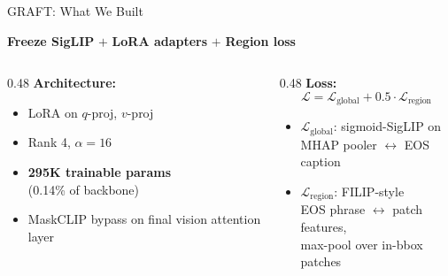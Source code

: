 \documentclass[aspectratio=169,12pt]{beamer}
\begin{document}
\begin{frame}{GRAFT: What We Built}
  \begin{center}
    \textbf{Freeze SigLIP} $+$ \textbf{LoRA adapters} $+$ \textbf{Region loss}
  \end{center}
  \vspace{0.3em}

  \begin{columns}[T]
    \begin{column}{0.48\textwidth}
      \textbf{Architecture:}
      \begin{itemize}
        \item LoRA on $q$-proj, $v$-proj
        \item Rank 4, $\alpha=16$
        \item \textbf{295K trainable params}\\(0.14\% of backbone)
        \item MaskCLIP bypass on final vision attention layer
      \end{itemize}
    \end{column}
    \begin{column}{0.48\textwidth}
      \textbf{Loss:}
      \begin{equation*}
        \mathcal{L} = \mathcal{L}_{\text{global}} + 0.5 \cdot \mathcal{L}_{\text{region}}
      \end{equation*}
      \begin{itemize}
        \item $\mathcal{L}_{\text{global}}$: sigmoid-SigLIP on\\
              MHAP pooler $\leftrightarrow$ EOS caption
        \item $\mathcal{L}_{\text{region}}$: FILIP-style\\
              EOS phrase $\leftrightarrow$ patch features,\\
              max-pool over in-bbox patches
      \end{itemize}
    \end{column}
  \end{columns}
\end{frame}
\end{document}

